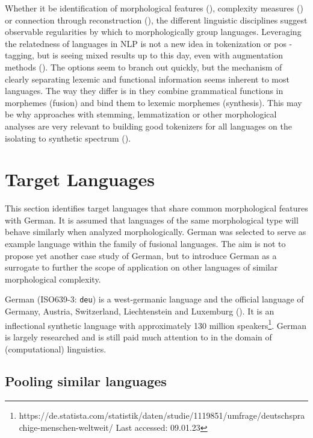 Whether it be identification of morphological features (\cite[42--56]{comrie1989}), complexity measures (\cite{measuresofMC}) or connection through reconstruction (\cite{INDOEUROPE}),
the different linguistic disciplines suggest observable regularities by which to morphologically group languages.
Leveraging the relatedness of languages in NLP is not a new idea in tokenization or \ac{pos} \hyphen tagging, but is seeing mixed results up to this day, even with augmentation methods (\cite{mixednoiseinterlanguage}).
The options seem to branch out quickly, but the mechanism of clearly separating lexemic and functional information seems inherent to most languages.
The way they differ is in they combine grammatical functions in morphemes (fusion) and bind them to lexemic morphemes (synthesis).
This may be why approaches with stemming, lemmatization or other morphological analyses are very relevant to building good tokenizers for all languages on the isolating to synthetic spectrum (\cite[51--53]{POLYSYNTHLM}).


\section{Target Languages}
\label{sec:target-languages}
This section identifies target languages that share common morphological features with German.
It is assumed that languages of the same morphological type will behave similarly when analyzed morphologically.
German was selected to serve as example language within the family of fusional languages.
The aim is not to propose yet another case study of German, but to introduce German as a surrogate to further the scope of application on other languages of similar morphological complexity.

German (ISO639-3: \texttt{deu}) is a west-germanic language and the official language of Germany, Austria, Switzerland, Liechtenstein and Luxemburg (\cite{METZLER2016}).
It is an inflectional synthetic language with approximately 130 million speakers\footnote{https://de.statista.com/statistik/daten/studie/1119851/umfrage/deutschsprachige-menschen-weltweit/ Last accessed: 09.01.23}.
German is largely researched and is still paid much attention to in the domain of (computational) linguistics.

\subsection{Pooling similar languages}
\label{subsec:german-as-example}


